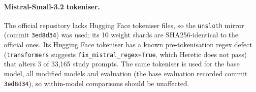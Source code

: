 \paragraph{Mistral-Small-3.2 tokeniser.}
The official repository lacks Hugging Face tokeniser files, so the
\texttt{unsloth} mirror (commit \texttt{3ed8d34}) was used; its 10 weight shards
are SHA256-identical to the official ones. Its Hugging Face tokeniser has a
known pre-tokenisation regex defect (\texttt{transformers} suggests
\texttt{fix\_mistral\_regex=True}, which Heretic does not pass) that alters 3 of
33,165 study prompts. The same tokeniser is used for the base model, all
modified models and evaluation (the base evaluation recorded commit
\texttt{3ed8d34}), so within-model comparisons should be unaffected.

